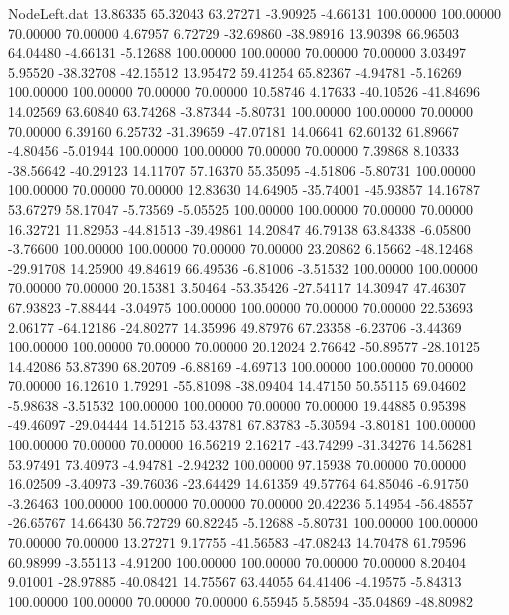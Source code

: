 \begin{filecontents}{NodeLeft.dat}
  13.86335   65.32043   63.27271    -3.90925   -4.66131  100.00000  100.00000   70.00000   70.00000    4.67957    6.72729  -32.69860  -38.98916
  13.90398   66.96503   64.04480    -4.66131   -5.12688  100.00000  100.00000   70.00000   70.00000    3.03497    5.95520  -38.32708  -42.15512
  13.95472   59.41254   65.82367    -4.94781   -5.16269  100.00000  100.00000   70.00000   70.00000   10.58746    4.17633  -40.10526  -41.84696
  14.02569   63.60840   63.74268    -3.87344   -5.80731  100.00000  100.00000   70.00000   70.00000    6.39160    6.25732  -31.39659  -47.07181
  14.06641   62.60132   61.89667    -4.80456   -5.01944  100.00000  100.00000   70.00000   70.00000    7.39868    8.10333  -38.56642  -40.29123
  14.11707   57.16370   55.35095    -4.51806   -5.80731  100.00000  100.00000   70.00000   70.00000   12.83630   14.64905  -35.74001  -45.93857
  14.16787   53.67279   58.17047    -5.73569   -5.05525  100.00000  100.00000   70.00000   70.00000   16.32721   11.82953  -44.81513  -39.49861
  14.20847   46.79138   63.84338    -6.05800   -3.76600  100.00000  100.00000   70.00000   70.00000   23.20862    6.15662  -48.12468  -29.91708
  14.25900   49.84619   66.49536    -6.81006   -3.51532  100.00000  100.00000   70.00000   70.00000   20.15381    3.50464  -53.35426  -27.54117
  14.30947   47.46307   67.93823    -7.88444   -3.04975  100.00000  100.00000   70.00000   70.00000   22.53693    2.06177  -64.12186  -24.80277
  14.35996   49.87976   67.23358    -6.23706   -3.44369  100.00000  100.00000   70.00000   70.00000   20.12024    2.76642  -50.89577  -28.10125
  14.42086   53.87390   68.20709    -6.88169   -4.69713  100.00000  100.00000   70.00000   70.00000   16.12610    1.79291  -55.81098  -38.09404
  14.47150   50.55115   69.04602    -5.98638   -3.51532  100.00000  100.00000   70.00000   70.00000   19.44885    0.95398  -49.46097  -29.04444
  14.51215   53.43781   67.83783    -5.30594   -3.80181  100.00000  100.00000   70.00000   70.00000   16.56219    2.16217  -43.74299  -31.34276
  14.56281   53.97491   73.40973    -4.94781   -2.94232  100.00000   97.15938   70.00000   70.00000   16.02509   -3.40973  -39.76036  -23.64429
  14.61359   49.57764   64.85046    -6.91750   -3.26463  100.00000  100.00000   70.00000   70.00000   20.42236    5.14954  -56.48557  -26.65767
  14.66430   56.72729   60.82245    -5.12688   -5.80731  100.00000  100.00000   70.00000   70.00000   13.27271    9.17755  -41.56583  -47.08243
  14.70478   61.79596   60.98999    -3.55113   -4.91200  100.00000  100.00000   70.00000   70.00000    8.20404    9.01001  -28.97885  -40.08421
  14.75567   63.44055   64.41406    -4.19575   -5.84313  100.00000  100.00000   70.00000   70.00000    6.55945    5.58594  -35.04869  -48.80982

\end{filecontents}
